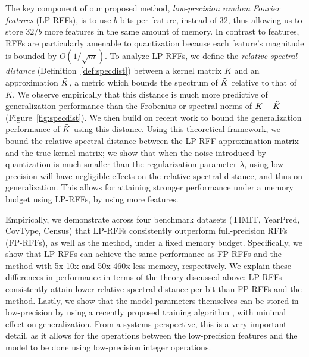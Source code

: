 The key component of our proposed method, \textit{low-precision random Fourier features} (LP-RFFs), is to use $b$ bits per feature, instead of 32, thus allowing us to store $32/b$ more features in the same amount of memory. In contrast to \Nystrom features, RFFs are particularly amenable to quantization because each feature's magnitude is bounded by $O(1/\sqrt{m})$.
To analyze LP-RFFs, we define the \textit{relative spectral distance} (Definition~\ref{def:specdist}) between a kernel matrix $K$ and an approximation $\tilde{K}$, a metric which bounds the spectrum of $\tilde{K}$ relative to that of $K$. We observe empirically that this distance is much more predictive of generalization performance than the Frobenius or spectral norms of $K-\tilde{K}$ (Figure~\ref{fig:specdist}). We then build on recent work \citep{avron17,musco17} to bound the generalization performance of $\tilde{K}$ using this distance. Using this theoretical framework, we bound the relative spectral distance between the LP-RFF approximation matrix and the true kernel matrix; we show that when the noise introduced by quantization is much smaller than the regularization parameter $\lambda$, using low-precision will have negligible effects on the relative spectral distance, and thus on generalization. This allows for attaining stronger performance under a memory budget using LP-RFFs, by using more features.

Empirically, we demonstrate across four benchmark datasets (TIMIT, YearPred, CovType, Census) that LP-RFFs consistently outperform full-precision RFFs (FP-RFFs), as well as the \Nystrom method, under a fixed memory budget. Specifically, we show that LP-RFFs can achieve the same performance as FP-RFFs and the \Nystrom method with 5x-10x and 50x-460x less memory, respectively. We explain these differences in performance in terms of the theory discussed above: LP-RFFs consistently attain lower relative spectral distance per bit than FP-RFFs and the \Nystrom method. Lastly, we show that the model parameters themselves can be stored in low-precision by using a recently proposed training algorithm \citep{halp18}, with minimal effect on generalization. From a systems perspective, this is a very important detail, as it allows for the operations between the low-precision features and the model to be done using low-precision integer operations.

